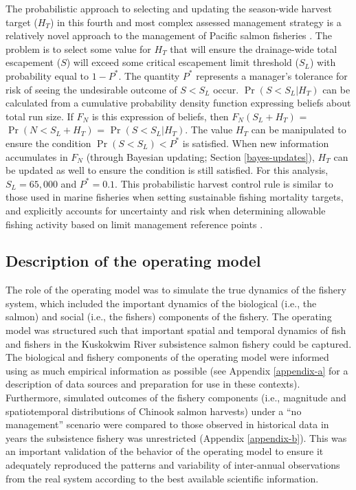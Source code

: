 \documentclass[12pt,]{book}
\theoremstyle{definition}
\theoremstyle{definition}
\theoremstyle{definition}
\theoremstyle{remark}
\begin{document}
The probabilistic approach to selecting and updating the season-wide
harvest target (\(H_T\)) in this fourth and most complex assessed
management strategy is a relatively novel approach to the management of
Pacific salmon fisheries \citep[but see][ for another application using
simulation techniques]{catalano-jones-2014}. The problem is to select
some value for \(H_T\) that will ensure the drainage-wide total
escapement (\(S\)) will exceed some critical escapement limit threshold
(\(S_L\)) with probability equal to \(1 - P^*\). The quantity \(P^*\)
represents a manager's tolerance for risk of seeing the undesirable
outcome of \(S < S_L\) occur. \(\Pr(S<S_L|H_T)\) can be calculated from
a cumulative probability density function expressing beliefs about total
run size. If \(F_N\) is this expression of beliefs, then
\(F_N(S_L + H_T)\) = \(\Pr(N < S_L + H_T)\) = \(\Pr(S<S_L|H_T)\). The
value \(H_T\) can be manipulated to ensure the condition
\(\Pr(S<S_L) < P^*\) is satisfied. When new information accumulates in
\(F_N\) (through Bayesian updating; Section \ref{bayes-updates}),
\(H_T\) can be updated as well to ensure the condition is still
satisfied. For this analysis, \(S_L = 65,000\) \citep[the lower bound of
the current drainage-wide escapement goal for Chinook
salmon;][]{hamazaki-etal-2012} and \(P^* = 0.1\). This probabilistic
harvest control rule is similar to those used in marine fisheries when
setting sustainable fishing mortality targets, and explicitly accounts
for uncertainty and risk when determining allowable fishing activity
based on limit management reference points
\citep{prager-etal-2003, shertzer-etal-2010}.

\subsection{Description of the operating model}\label{om}

\noindent
The role of the operating model was to simulate the true dynamics of the
fishery system, which included the important dynamics of the biological
(i.e., the salmon) and social (i.e., the fishers) components of the
fishery. The operating model was structured such that important spatial
and temporal dynamics of fish and fishers in the Kuskokwim River
subsistence salmon fishery could be captured. The biological and fishery
components of the operating model were informed using as much empirical
information as possible (see Appendix \ref{appendix-a} for a description
of data sources and preparation for use in these contexts). Furthermore,
simulated outcomes of the fishery components (i.e., magnitude and
spatiotemporal distributions of Chinook salmon harvests) under a ``no
management'' scenario were compared to those observed in historical data
in years the subsistence fishery was unrestricted (Appendix
\ref{appendix-b}). This was an important validation of the behavior of
the operating model to ensure it adequately reproduced the patterns and
variability of inter-annual observations from the real system according
to the best available scientific information.
\end{document}
